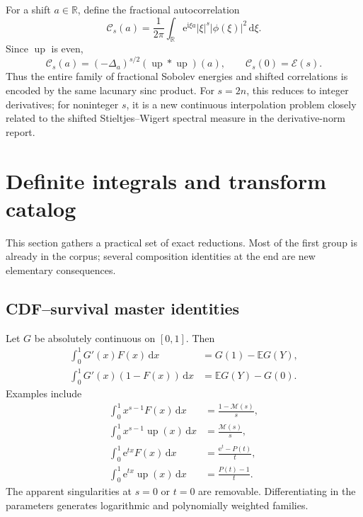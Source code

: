 \documentclass[11pt,oneside]{article}
\numberwithin{equation}{section}
\theoremstyle{plain}
\theoremstyle{definition}
\theoremstyle{remark}
\newcommand{\R}{\mathbb R}
\newcommand{\E}{\mathbb E}
\newcommand{\Up}{\operatorname{up}}
\newcommand{\dd}{\,\mathrm d}
\newcommand{\e}{\mathrm e}
\newcommand{\ii}{\mathrm i}
\newcommand{\Mell}{\mathcal M}
\begin{document}
For a shift $a\in\R$, define the fractional autocorrelation
\begin{equation}
 \mathcal C_s(a)
 =\frac1{2\pi}\int_{\R}
  \e^{\ii\xi a}|\xi|^s|\phi(\xi)|^2\dd\xi.
 \label{eq:C-s-a}
\end{equation}
Since $\Up$ is even,
\begin{equation}
 \mathcal C_s(a)
 =(-\Delta_a)^{s/2}(\Up*\Up)(a),
 \qquad
 \mathcal C_s(0)=\mathcal E(s).
 \label{eq:C-fractional-correlation}
\end{equation}
Thus the entire family of fractional Sobolev energies and shifted correlations
is encoded by the same lacunary sinc product.  For $s=2n$, this reduces to
integer derivatives; for noninteger $s$, it is a new continuous interpolation
problem closely related to the shifted Stieltjes--Wigert spectral measure in
the derivative-norm report.

\section{Definite integrals and transform catalog}
\label{sec:definite-catalog}

This section gathers a practical set of exact reductions.  Most of the first
group is already in the corpus; several composition identities at the end are
new elementary consequences.

\subsection{CDF--survival master identities}

Let $G$ be absolutely continuous on $[0,1]$.  Then
\begin{align}
 \int_0^1G'(x)F(x)\dd x
 &=G(1)-\E G(Y),
 \label{eq:CDF-master}\\
 \int_0^1G'(x)(1-F(x))\dd x
 &=\E G(Y)-G(0).
 \label{eq:survival-master}
\end{align}
Examples include
\begin{align}
 \int_0^1x^{s-1}F(x)\dd x
 &=\frac{1-\Mell(s)}s,
 \label{eq:Mellin-F}\\
 \int_0^1x^{s-1}\Up(x)\dd x
 &=\frac{\Mell(s)}s,
 \label{eq:Mellin-half-up}\\
 \int_0^1\e^{tx}F(x)\dd x
 &=\frac{\e^t-P(t)}t,
 \label{eq:Laplace-F}\\
 \int_0^1\e^{tx}\Up(x)\dd x
 &=\frac{P(t)-1}t.
 \label{eq:Laplace-half-up}
\end{align}
The apparent singularities at $s=0$ or $t=0$ are removable.  Differentiating
in the parameters generates logarithmic and polynomially weighted families.
\end{document}
